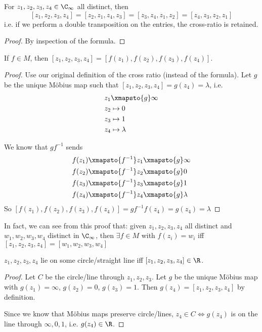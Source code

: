 \documentclass[a4paper]{article}
\begin{document}
  \begin{lemma}
    For $z_1, z_2, z_3, z_4\in \C_\infty$ all distinct, then
    \[
      [z_1, z_2, z_3, z_4] = [z_2, z_1, z_4, z_3] = [z_3, z_4, z_1, z_2] = [z_4, z_3, z_2, z_1]
    \]
    i.e. if we perform a double transposition on the entries, the cross-ratio is retained.
  \end{lemma}

  \begin{proof}
    By inspection of the formula.
  \end{proof}

  \begin{prop}
    If $f\in M$, then $[z_1, z_2, z_3, z_4] = [f(z_1), f(z_2), f(z_3), f(z_4)]$.
  \end{prop}

  \begin{proof}
    Use our original definition of the cross ratio (instead of the formula). Let $g$ be the unique M\"obius map such that $[z_1, z_2, z_3, z_4] = g(z_4) = \lambda$, i.e.
    \begin{align*}
      z_1 &\xmapsto{g} \infty\\
      z_2 &\mapsto 0\\
      z_3 &\mapsto 1\\
      z_4 &\mapsto \lambda
    \end{align*}

    We know that $gf^{-1}$ sends
    \begin{align*}
      f(z_1)\xmapsto{f^{-1}} z_1 &\xmapsto{g} \infty\\
      f(z_2)\xmapsto{f^{-1}} z_2 &\xmapsto{g} 0\\
      f(z_3)\xmapsto{f^{-1}} z_3 &\xmapsto{g} 1\\
      f(z_4)\xmapsto{f^{-1}} z_4 &\xmapsto{g} \lambda
    \end{align*}
    So $[f(z_1), f(z_2), f(z_3), f(z_4)] = gf^{-1}f(z_4) = g(z_4) = \lambda$
  \end{proof}

  In fact, we can see from this proof that: given $z_1, z_2, z_3, z_4$ all distinct and $w_1, w_2, w_3, w_4$ distinct in $\C_\infty$, then $\exists f\in M$ with $f(z_i) = w_i$ iff $[z_1, z_2, z_3, z_4] = [w_1, w_2, w_3, w_4]$

  \begin{cor}
    $z_1, z_2, z_3, z_4$ lie on some circle/straight line iff $[z_1, z_2, z_3, z_4]\in \R$.
  \end{cor}

  \begin{proof}
    Let $C$ be the circle/line through $z_1, z_2, z_3$. Let $g$ be the unique M\"obius map with $g(z_1) = \infty$, $g(z_2) = 0$, $g(z_3) = 1$. Then $g(z_4) = [z_1, z_2, z_3, z_4]$ by definition.

    Since we know that M\"obius maps preserve circle/lines, $z_4\in C \Leftrightarrow g(z_4)$ is on the line through $\infty, 0, 1$, i.e. $g(z_4) \in \R$.
  \end{proof}
\end{document}
